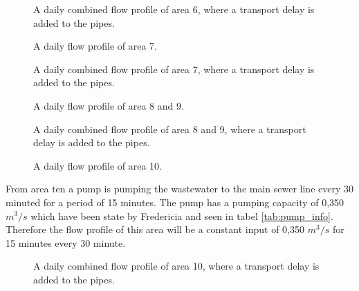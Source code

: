 \begin{figure}[H]
\centering

\caption{A daily combined flow profile of area 6, where a transport delay is added to the pipes.}
\label{fig:flow_profile_zone_6_combined_with_delay}
\end{figure} 

\begin{figure}[H]
\centering

\caption{A daily flow profile of area 7.}
\label{fig:APP_flow_profile_zone7}
\end{figure} 

\begin{figure}[H]
\centering

\caption{A daily combined flow profile of area 7, where a transport delay is added to the pipes.}
\label{fig:flow_profile_zone_7_combined_with_delay}
\end{figure} 

\begin{figure}[H]
\centering

\caption{A daily flow profile of area 8 and 9.}
\label{fig:APP_flow_profile_zone8_9}
\end{figure} 

\begin{figure}[H]
\centering

\caption{A daily combined flow profile of area 8 and 9, where a transport delay is added to the pipes.}
\label{fig:flow_profile_zone_2_combined_with_delay}
\end{figure} 

\begin{figure}[H]
\centering

\caption{A daily flow profile of area 10.}
\label{fig:APP_flow_profile_zone10}
\end{figure} 

From area ten a pump is pumping the wastewater to the main sewer line every 30 minuted for a period of 15 minutes. The pump has a pumping capacity of 0,350 $m^3/s$ which have been state by Fredericia and seen in tabel \ref{tab:pump_info}. Therefore the flow profile of this area will be a constant input of 0,350 $m^3/s$ for 15 minutes every 30 minute. 

\begin{figure}[H]
\centering

\caption{A daily combined flow profile of area 10, where a transport delay is added to the pipes.}
\label{fig:flow_profile_zone_10_combined_with_delay}
\end{figure} 

